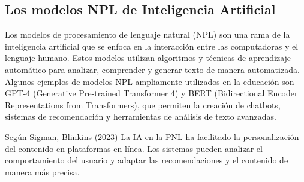 \documentclass{article}
\newenvironment{marcoTeorico}{}{}
\begin{document}
\begin{marcoTeorico}
  \subsection{Los modelos NPL de Inteligencia Artificial}

  Los modelos de procesamiento de lenguaje natural (NPL) son una rama de la inteligencia artificial que se enfoca en la interacción entre las computadoras y el lenguaje humano. Estos modelos utilizan algoritmos y técnicas de aprendizaje automático para analizar, comprender y generar texto de manera automatizada. Algunos ejemplos de modelos NPL ampliamente utilizados en la educación son GPT-4 (Generative Pre-trained Transformer 4) y BERT (Bidirectional Encoder Representations from Transformers), que permiten la creación de chatbots, sistemas de recomendación y herramientas de análisis de texto avanzadas.

  Según Sigman, Blinkins (2023) La  IA  en  la  PNL  ha  facilitado  la  personalización  del  contenido  en  plataformas  en línea.   Los   sistemas   pueden   analizar   el   comportamiento   del   usuario   y   adaptar   las recomendaciones y el contenido de manera más precisa.
\end{marcoTeorico}

\newpage
\end{document}
